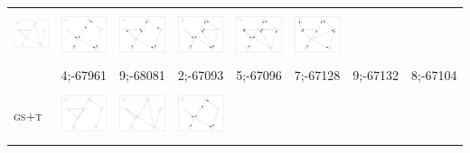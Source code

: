 \begin{table}[!p]
\begin{tabular}{r@{}p{2.0cm}@{}p{2.0cm}@{}p{2.0cm}@{}p{2.0cm}@{}p{2.0cm}@{}p{2.0cm}@{}p{2.0cm}}
\includegraphics[width=20.3mm, height=14.25mm]{fig/11-Aug-2003-15-08-57-dag-asia500-GS-RES} &
\includegraphics[width=20.3mm, height=14.25mm]{fig/26-Feb-2003-16-33-13-dag-asia1000-GS-RES} &
\includegraphics[width=20.3mm, height=14.25mm]{fig/26-Feb-2003-16-33-13-dag-asia2000-GS-RES} &
\includegraphics[width=20.3mm, height=14.25mm]{fig/26-Feb-2003-16-33-13-dag-asia5000-GS-RES} &
\includegraphics[width=20.3mm, height=14.25mm]{fig/26-Feb-2003-16-33-13-dag-asia10000-GS-RES} &
\includegraphics[width=20.3mm, height=14.25mm]{fig/26-Feb-2003-16-33-13-dag-asia15000-GS-RES} \\
& 4;-67961 & 9;-68081 & 2;-67093 & 5;-67096 & 7;-67128 & 9;-67132 & 8;-67104 \\
\textsc{gs+t~} &
\includegraphics[width=20.3mm, height=14.25mm]{fig/11-Sep-2003-14-39-38-dag-asia250-GS-MSWT-RES} &
\includegraphics[width=20.3mm, height=14.25mm]{fig/11-Aug-2003-15-08-57-dag-asia500-GS-MSWT-RES} &
\includegraphics[width=20.3mm, height=14.25mm]{fig/26-Feb-2003-16-33-13-dag-asia1000-GS-MSWT-RES} &

\end{tabular}
\end{table}
